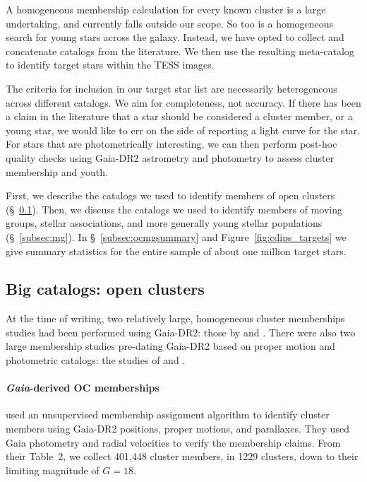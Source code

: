 \documentclass[12pt,twocolumn,tighten]{aastex62}
\begin{document}
A homogeneous membership calculation for every known cluster is a
large undertaking, and currently falls outside our scope.  So
too is a homogeneous search for young stars across the galaxy.
Instead, we have opted to collect and concatenate catalogs
from the literature.  We then use the resulting meta-catalog to
identify target stars within the TESS images.

The criteria for inclusion in our target star list are
necessarily heterogeneous across different catalogs.  
We aim for completeness, not accuracy.  If
there has been a claim in the literature that a star should be
considered a cluster member, or a young star, we would like to err on
the side of reporting a light curve for the star.  For stars that are
photometrically interesting, we can then perform post-hoc quality
checks using Gaia-DR2 astrometry and photometry to assess cluster
membership and youth.

First, we describe the catalogs we used to identify
members of open clusters (\S~\ref{subsec:oc}). 
Then, we discuss the
catalogs we used to identify members of moving groups,
stellar associations, and more generally young stellar
populations (\S~\ref{subsec:mg}).
In
 \S~\ref{subsec:ocmgsummary}
and Figure~\ref{fig:cdips_targets} we give summary statistics for the
entire sample of about one million target stars.

\subsection{Big catalogs: open clusters}
\label{subsec:oc}

At the time of writing, two relatively large, homogeneous cluster
memberships studies had been performed using Gaia-DR2: those by
\citet{cantat-gaudin_gaia_2018} and \citet{gaia_hr_2018}.
There were also two large membership studies pre-dating Gaia-DR2 based on proper motion and 
photometric catalogs: the studies of
\citet{Kharchenko_et_al_2013} and \citet{dias_proper_2014}.

\paragraph{{\it Gaia}-derived OC memberships}

\citet{cantat-gaudin_gaia_2018} used an unsupervised membership
assignment algorithm \citep{krone-martins_upmask_2014} to identify cluster
members using Gaia-DR2 positions, proper motions, and parallaxes.
They used Gaia photometry and radial velocities to verify the
membership claims.  From their Table~2, we collect
401{,}448 cluster members, in 1229 clusters, down to their limiting magnitude
of $G=18$.
\end{document}
